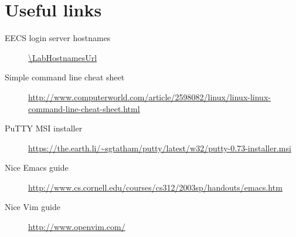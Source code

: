 \documentclass{tufte-handout}
\def\PuTTYurl{https://the.earth.li/~sgtatham/putty/latest/w32/putty-0.73-installer.msi}
\begin{document}
\section{Useful links}

\begin{description}

\item[EECS login server hostnames]
\url{\LabHostnamesUrl}

\item[Simple command line cheat sheet]
\url{http://www.computerworld.com/article/2598082/linux/linux-linux-command-line-cheat-sheet.html}

\item[PuTTY MSI installer]
\url{\PuTTYurl}

\item[Nice Emacs guide]
\url{http://www.cs.cornell.edu/courses/cs312/2003sp/handouts/emacs.htm}

\item[Nice Vim guide]
\url{http://www.openvim.com/}

\end{description}
\end{document}
